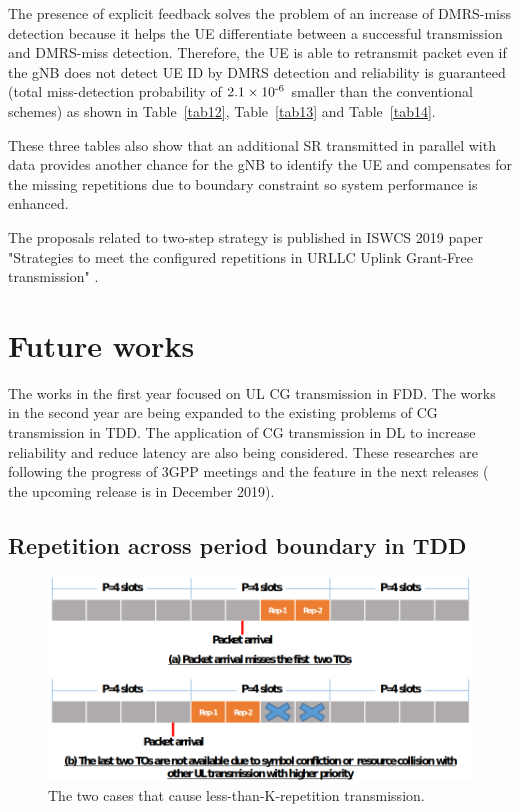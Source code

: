 \documentclass{report}
\begin{document}
The presence of explicit feedback solves the problem of an increase of DMRS-miss detection because it helps the UE differentiate between a successful transmission and DMRS-miss detection. Therefore, the UE is able to retransmit packet even if the gNB does not detect UE ID by DMRS detection and reliability is guaranteed (total miss-detection probability of $2.1\times10\textsuperscript{-6}$ smaller than the conventional schemes) as shown in Table~\ref{tab12}, Table~\ref{tab13} and Table~\ref{tab14}.

These three tables also show that an additional SR transmitted in parallel with data provides another chance for the gNB to identify the UE and compensates for the missing repetitions due to boundary constraint so system performance is enhanced. 

The proposals related to two-step strategy is published in ISWCS 2019 paper "Strategies to meet the configured repetitions in URLLC Uplink Grant-Free transmission" \cite{ad100}. 

\chapter{Future works} \label{S4}

The works in the first year focused on UL CG transmission in FDD. The works in the second year are being expanded to the existing problems of CG transmission in TDD. The application of CG transmission in DL to increase reliability and reduce latency are also being considered. These researches are following the progress of 3GPP meetings and the feature in the next releases ( the upcoming release is in December 2019).

\section{Repetition across period boundary in TDD}

\begin{figure}[htbp]
\centerline{\includegraphics[scale=0.35]{fig30.png}}
\caption{The two cases that cause less-than-K-repetition transmission.}
\label{fig30}
\end{figure}
\end{document}
